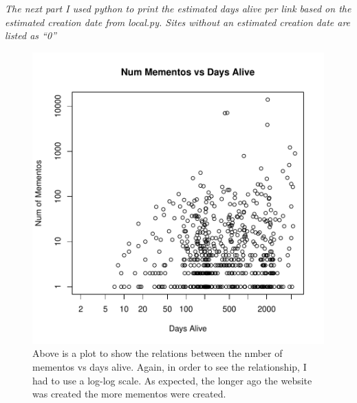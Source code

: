 \documentclass{article}
\begin{document}


{\it 
The next part I used python to print the estimated days alive per link based on the estimated creation date from local.py.  Sites without an estimated creation date are listed as ``0''
}





\begin{figure}[h!]
    \includegraphics[width=\textwidth]{prob3}
    \caption{Above is a plot to show the relations between the nmber of mementos vs days alive.  Again, in order to see the relationship, I had to use a log-log scale.  As expected, the longer ago the website was created the more mementos were created.}
\end{figure}


 
\end{document}
